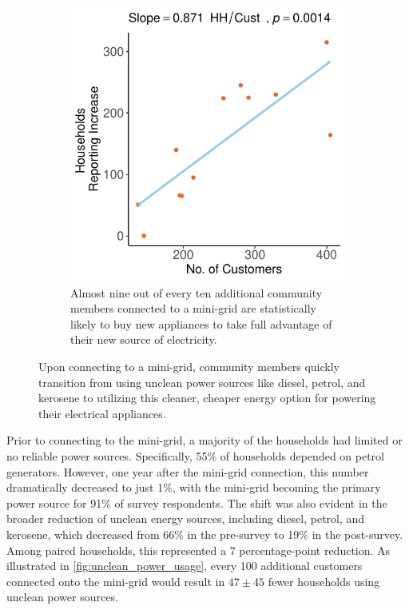 \begin{figure}[th]
\begin{subfigure}[t]{0.48\textwidth}
        \centering
        \includegraphics[width=\textwidth]{images/appliances_count_regression_community.pdf}
        \caption{Almost nine out of every ten additional community members connected to a mini-grid are statistically likely to buy new appliances to take full advantage of their new source of electricity.}
        \label{fig:appliances}
    \end{subfigure}
    \caption{Upon connecting to a mini-grid, community members quickly transition from using unclean power sources like diesel, petrol, and kerosene to utilizing this cleaner, cheaper energy option for powering their electrical appliances.}
    \label{fig:appliances-and-unclean-power}
\end{figure}

Prior to connecting to the mini-grid, a majority of the households had limited or no reliable power sources. Specifically, 55\% of households depended on petrol generators. However, one year after the mini-grid connection, this number dramatically decreased to just 1\%, with the mini-grid becoming the primary power source for 91\% of survey respondents. The shift was also evident in the broader reduction of unclean energy sources, including diesel, petrol, and kerosene, which decreased from 66\% in the pre-survey to 19\% in the post-survey. Among paired households, this represented a 7 percentage-point reduction. As illustrated in \cref{fig:unclean_power_usage}, every 100 additional customers connected onto the mini-grid would result in $47\pm45$ fewer households using unclean power sources.

